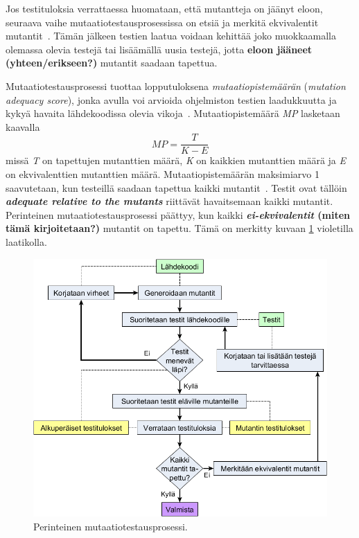 \documentclass[finnish, grading]{tktltiki2}
\theoremstyle{definition}
\theoremstyle{remark}
\begin{document}
Jos testituloksia verrattaessa huomataan, että mutantteja on jäänyt eloon, seuraava vaihe mutaatiotestausprosessissa on etsiä ja merkitä ekvivalentit mutantit~\cite[s. 36]{Offutt:Untch:2001}. Tämän jälkeen testien laatua voidaan kehittää joko muokkaamalla olemassa olevia testejä tai lisäämällä uusia testejä, jotta \textbf{eloon jääneet (yhteen/erikseen?)} mutantit saadaan tapettua.

Mutaatiotestausprosessi tuottaa lopputuloksena \textit{mutaatiopistemäärän} (\textit{mutation adequacy score}), jonka avulla voi arvioida ohjelmiston testien laadukkuutta ja kykyä havaita lähdekoodissa olevia vikoja~\cite[s. 652]{Jia:Harman:2011}. Mutaatiopistemäärä \textit{MP} lasketaan kaavalla 
\begin{equation}
MP = \frac{T}{K - E}
\end{equation}
missä \textit{T} on tapettujen mutanttien määrä, \textit{K} on kaikkien mutanttien määrä ja \textit{E} on ekvivalenttien mutanttien määrä. Mutaatiopistemäärän maksimiarvo 1 saavutetaan, kun testeillä saadaan tapettua kaikki mutantit~\cite[s. 36]{Offutt:Untch:2001}. Testit ovat tällöin \textit{\textbf{adequate relative to the mutants}} riittävät havaitsemaan kaikki mutantit. Perinteinen mutaatiotestausprosessi päättyy, kun kaikki \textbf{\textit{ei-ekvivalentit} (miten tämä kirjoitetaan?)} mutantit on tapettu. Tämä on merkitty kuvaan \ref{figure:Mutaatiotestausprosessi} violetilla laatikolla.

\begin{figure}[H]
	\centering
		\includegraphics[width=\textwidth]{mutaatiotestausprosessi2}
	\caption{Perinteinen mutaatiotestausprosessi.}
	\label{figure:Mutaatiotestausprosessi}
\end{figure}
\end{document}

